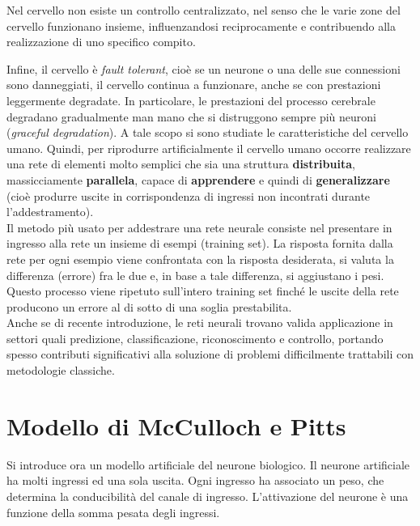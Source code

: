 Nel cervello non esiste un controllo centralizzato, nel senso che le varie zone del cervello funzionano insieme, influenzandosi reciprocamente e contribuendo alla realizzazione di uno specifico compito.

\newpage

Infine, il cervello è \emph{fault tolerant}, cioè se un neurone o una delle sue connessioni sono danneggiati, il cervello continua a funzionare, anche se con prestazioni leggermente degradate. In particolare, le prestazioni del processo cerebrale degradano gradualmente man mano che si distruggono sempre più neuroni (\emph{graceful degradation}).
A tale scopo si sono studiate le caratteristiche del cervello umano.
Quindi, per riprodurre artificialmente il cervello umano occorre realizzare una rete di elementi molto semplici che sia una struttura \textbf{distribuita}, massicciamente \textbf{parallela}, capace di \textbf{apprendere} e quindi di \textbf{generalizzare} (cioè produrre uscite in corrispondenza di ingressi non incontrati durante l’addestramento).\\

Il metodo più usato per addestrare una rete neurale consiste nel presentare in ingresso alla rete un insieme di esempi (training set). La risposta fornita dalla rete per ogni esempio viene confrontata con la risposta desiderata, si valuta la differenza (errore) fra le due e, in base a tale differenza, si aggiustano i pesi. Questo processo viene ripetuto sull’intero training set finché le uscite della rete producono un errore al di sotto di una soglia prestabilita.\\

Anche se di recente introduzione, le reti neurali trovano valida applicazione in settori quali predizione, classificazione, riconoscimento e controllo, portando spesso contributi significativi alla soluzione di problemi difficilmente trattabili con metodologie classiche.

\newpage

\section{Modello di McCulloch e Pitts} %
\label{sec:modello_di_mcculloch_e_pitts}
Si introduce ora un modello artificiale del neurone biologico. Il neurone artificiale ha molti ingressi ed una sola uscita. Ogni ingresso ha associato un peso, che determina la conducibilità del canale di ingresso. L’attivazione del neurone è una funzione della somma pesata degli ingressi.

